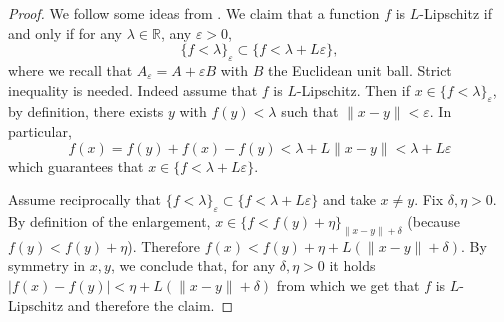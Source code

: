 \documentclass[11pt]{article}
\newcommand{\1}{[1]}
\begin{document}
\begin{proof}
   We follow some ideas from \cite{MDA25}.
   We claim that a function $f$ is $L$-Lipschitz if and only if for any $\lambda \in \mathbb{R}$, any $\varepsilon>0$, 
   $$
   \{f < \lambda\}_\varepsilon \subset \{f < \lambda +L\varepsilon\},
   $$
   where we recall that $A_\varepsilon=A+\varepsilon B$ with $B$ the Euclidean unit ball. Strict inequality is needed. Indeed assume that $f$ is $L$-Lipschitz. Then if $x \in \{f < \lambda\}_\varepsilon$, by definition, there exists
   $y$ with $f(y)<\lambda$ such that $\|x-y\| < \varepsilon$. In particular,
   $$
   f(x) 
   = 
   f(y) + f(x) - f(y)  
   <
   \lambda + 
   L\|x-y\| 
   <
   \lambda + L \varepsilon  
   $$
which guarantees that $x \in \{f < \lambda +L\varepsilon\}$.

Assume reciprocally that $\{f < \lambda\}_\varepsilon \subset \{f < \lambda +L\varepsilon\}$ and take $x \neq y$. Fix $\delta,\eta>0$. By definition of the enlargement, $x \in \{ f < f(y)+\eta\}_{\|x-y\|+\delta}$ (because $f(y)<f(y)+\eta$). Therefore 
$f(x) < f(y)+\eta + L(\|x-y\|+\delta)$. By symmetry in $x,y$, we conclude that, for any $\delta,\eta>0$ it holds 
$|f(x)-f(y)| < \eta + L(\|x-y\|+\delta)$ from which we get that $f$ is $L$-Lipschitz and therefore the claim.


\end{proof}
\end{document}
